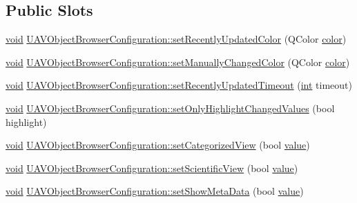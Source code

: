 \subsection*{Public Slots}
\begin{DoxyCompactItemize}
\item 
\hyperlink{group___u_a_v_objects_plugin_ga444cf2ff3f0ecbe028adce838d373f5c}{void} \hyperlink{group___u_a_v_object_browser_plugin_gaf53d59e82beee15d1cafdfe22d9fcac6}{U\-A\-V\-Object\-Browser\-Configuration\-::set\-Recently\-Updated\-Color} (Q\-Color \hyperlink{glext_8h_a3ea846f998d64f079b86052b6c4193a8}{color})
\item 
\hyperlink{group___u_a_v_objects_plugin_ga444cf2ff3f0ecbe028adce838d373f5c}{void} \hyperlink{group___u_a_v_object_browser_plugin_gab8f25b7b00cb2f219ac53627e4ae7fba}{U\-A\-V\-Object\-Browser\-Configuration\-::set\-Manually\-Changed\-Color} (Q\-Color \hyperlink{glext_8h_a3ea846f998d64f079b86052b6c4193a8}{color})
\item 
\hyperlink{group___u_a_v_objects_plugin_ga444cf2ff3f0ecbe028adce838d373f5c}{void} \hyperlink{group___u_a_v_object_browser_plugin_ga315e76c383270fc3ab6ec717ca0dd0e3}{U\-A\-V\-Object\-Browser\-Configuration\-::set\-Recently\-Updated\-Timeout} (\hyperlink{ioapi_8h_a787fa3cf048117ba7123753c1e74fcd6}{int} timeout)
\item 
\hyperlink{group___u_a_v_objects_plugin_ga444cf2ff3f0ecbe028adce838d373f5c}{void} \hyperlink{group___u_a_v_object_browser_plugin_gaf4d1a9bda21db2cc36ab4964ecb69fa4}{U\-A\-V\-Object\-Browser\-Configuration\-::set\-Only\-Highlight\-Changed\-Values} (bool highlight)
\item 
\hyperlink{group___u_a_v_objects_plugin_ga444cf2ff3f0ecbe028adce838d373f5c}{void} \hyperlink{group___u_a_v_object_browser_plugin_ga733d1a12782c0f87157f99566bde9e70}{U\-A\-V\-Object\-Browser\-Configuration\-::set\-Categorized\-View} (bool \hyperlink{glext_8h_aa0e2e9cea7f208d28acda0480144beb0}{value})
\item 
\hyperlink{group___u_a_v_objects_plugin_ga444cf2ff3f0ecbe028adce838d373f5c}{void} \hyperlink{group___u_a_v_object_browser_plugin_gac72aa6686e16d9e653a7974c066cd345}{U\-A\-V\-Object\-Browser\-Configuration\-::set\-Scientific\-View} (bool \hyperlink{glext_8h_aa0e2e9cea7f208d28acda0480144beb0}{value})
\item 
\hyperlink{group___u_a_v_objects_plugin_ga444cf2ff3f0ecbe028adce838d373f5c}{void} \hyperlink{group___u_a_v_object_browser_plugin_ga4105ee0a19a4196780e26ed03880f150}{U\-A\-V\-Object\-Browser\-Configuration\-::set\-Show\-Meta\-Data} (bool \hyperlink{glext_8h_aa0e2e9cea7f208d28acda0480144beb0}{value})

\end{DoxyCompactItemize}

